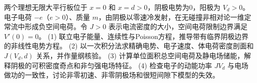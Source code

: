 两个理想无限大平行板位于 \(x=0\) 和 \(x=d>0\)，阴极电势为0，阳极为 \(V_d>0\)。电子电荷 \(-e\)（\(e>0\)）、质量 \(m\)，由阴极以零速冷发射，在无碰撞非相对论一维定常流中形成负空间电荷。令 \(J>0\) 表示电流密度的大小，空间电荷限制边界满足 \(V'(0)=0\)。
(1) 联立电子能量、连续性与Poisson方程，推导带有临界阴极边界的非线性电势方程。
(2) 以一次积分法求精确电势、电子速度、体电荷密度剖面和 \(J(V_d,d)\) 关系，并作量纲核验。
(3) 计算单位面积总空间电荷及静电场储能，解释阴极的可积密度奇点和非匀强电场特征。
(4) 检查电子的动能功率 \(JV_d\) 与电场做功的一致性，讨论非零初速、非零阴极场和很短间隙下模型的失效。
